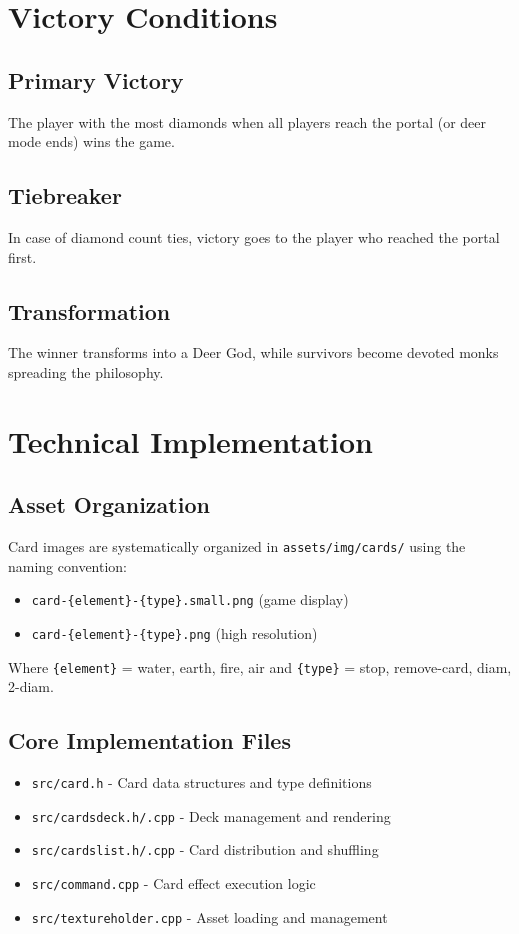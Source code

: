 \documentclass[12pt,a4paper]{article}
\begin{document}
\section{Victory Conditions}

\subsection{Primary Victory}
The player with the most diamonds when all players reach the portal (or deer mode ends) wins the game.

\subsection{Tiebreaker}
In case of diamond count ties, victory goes to the player who reached the portal first.

\subsection{Transformation}
The winner transforms into a Deer God, while survivors become devoted monks spreading the philosophy.

\section{Technical Implementation}

\subsection{Asset Organization}
Card images are systematically organized in \texttt{assets/img/cards/} using the naming convention:
\begin{itemize}
    \item \texttt{card-\{element\}-\{type\}.small.png} (game display)
    \item \texttt{card-\{element\}-\{type\}.png} (high resolution)
\end{itemize}

Where \texttt{\{element\}} = water, earth, fire, air and \texttt{\{type\}} = stop, remove-card, diam, 2-diam.

\subsection{Core Implementation Files}
\begin{itemize}
    \item \texttt{src/card.h} - Card data structures and type definitions
    \item \texttt{src/cardsdeck.h/.cpp} - Deck management and rendering
    \item \texttt{src/cardslist.h/.cpp} - Card distribution and shuffling
    \item \texttt{src/command.cpp} - Card effect execution logic
    \item \texttt{src/textureholder.cpp} - Asset loading and management
\end{itemize}
\end{document}
